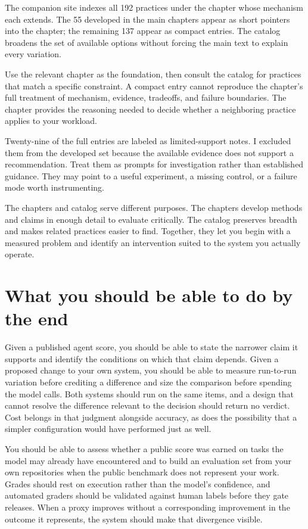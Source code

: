 The companion site indexes all 192 practices under the chapter whose mechanism each extends. The 55 developed in the main chapters appear as short pointers into the chapter; the remaining 137 appear as compact entries. The catalog broadens the set of available options without forcing the main text to explain every variation.

Use the relevant chapter as the foundation, then consult the catalog for practices that match a specific constraint. A compact entry cannot reproduce the chapter's full treatment of mechanism, evidence, tradeoffs, and failure boundaries. The chapter provides the reasoning needed to decide whether a neighboring practice applies to your workload.

Twenty-nine of the full entries are labeled as limited-support notes. I excluded them from the developed set because the available evidence does not support a recommendation. Treat them as prompts for investigation rather than established guidance. They may point to a useful experiment, a missing control, or a failure mode worth instrumenting.

The chapters and catalog serve different purposes. The chapters develop methods and claims in enough detail to evaluate critically. The catalog preserves breadth and makes related practices easier to find. Together, they let you begin with a measured problem and identify an intervention suited to the system you actually operate.

\section{What you should be able to do by the end}\label{what-you-should-be-able-to-do-by-the-end}

Given a published agent score, you should be able to state the narrower claim it supports and identify the conditions on which that claim depends. Given a proposed change to your own system, you should be able to measure run-to-run variation before crediting a difference and size the comparison before spending the model calls. Both systems should run on the same items, and a design that cannot resolve the difference relevant to the decision should return no verdict. Cost belongs in that judgment alongside accuracy, as does the possibility that a simpler configuration would have performed just as well.

You should be able to assess whether a public score was earned on tasks the model may already have encountered and to build an evaluation set from your own repositories when the public benchmark does not represent your work. Grades should rest on execution rather than the model's confidence, and automated graders should be validated against human labels before they gate releases. When a proxy improves without a corresponding improvement in the outcome it represents, the system should make that divergence visible.


